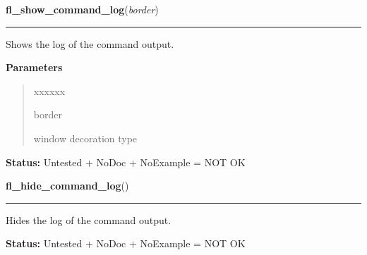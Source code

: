     \label{xformslib:library:fl_show_command_log}

    \vspace{0.5ex}

\hspace{.8\funcindent}\begin{boxedminipage}{\funcwidth}

    \raggedright \textbf{fl\_show\_command\_log}(\textit{border})

    \vspace{-1.5ex}

    \rule{\textwidth}{0.5\fboxrule}
\setlength{\parskip}{2ex}
    Shows the log of the command output.

\setlength{\parskip}{1ex}
      \textbf{Parameters}
      \vspace{-1ex}

      \begin{quote}
        \begin{Ventry}{xxxxxx}

          \item[border]

          window decoration type

        \end{Ventry}

      \end{quote}

\textbf{Status:} Untested + NoDoc + NoExample = NOT OK



    \end{boxedminipage}

    \label{xformslib:library:fl_hide_command_log}

    \vspace{0.5ex}

\hspace{.8\funcindent}\begin{boxedminipage}{\funcwidth}

    \raggedright \textbf{fl\_hide\_command\_log}()

    \vspace{-1.5ex}

    \rule{\textwidth}{0.5\fboxrule}
\setlength{\parskip}{2ex}
    Hides the log of the command output.

\setlength{\parskip}{1ex}
\textbf{Status:} Untested + NoDoc + NoExample = NOT OK



    \end{boxedminipage}

